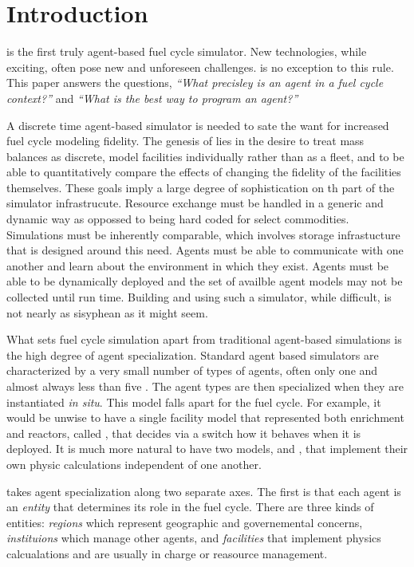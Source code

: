 \section{Introduction}

\Cyclus \citeme is the first truly agent-based \citeme fuel cycle simulator. 
New technologies, while exciting, often pose new and unforeseen challenges.
\Cyclus is no exception to this rule.  This paper answers the questions,
\emph{``What precisley is an agent in a fuel cycle context?''} and 
\emph{``What is the best way to program an agent?''}

A discrete time agent-based simulator is needed to sate the want for increased 
fuel cycle modeling fidelity. The genesis of \cyclus lies in the desire to 
treat mass balances as discrete, model facilities individually rather than as 
a fleet, and to be able to quantitatively compare the effects of changing the 
fidelity of the facilities themselves. These goals imply a large degree of 
sophistication on th part of the simulator infrastrucute.  Resource exchange
must be handled in a generic and dynamic way as oppossed to being hard coded 
for select commodities. Simulations must be inherently comparable, which involves 
storage infrastucture that is designed around this need. Agents must be able 
to communicate with one another and learn about the environment in which they 
exist. Agents must be able to be dynamically deployed and the set of 
availble agent models may not be collected until run time. Building and using such a
simulator, while difficult, is not nearly as sisyphean as it might seem. 

What sets fuel cycle simulation apart from traditional agent-based simulations 
is the high degree of agent specialization. Standard agent based simulators
are characterized by a very small number of types of agents, often only one and 
almost always less than five \citeme. The agent types are then specialized 
when they are instantiated \emph{in situ}. This model falls apart for the 
fuel cycle.  For example, it would be unwise to have a single facility model 
that represented both enrichment and reactors, called ,
that decides via a switch how it behaves when it is deployed. It is much 
more natural to have two models,  and , 
that implement their own physic calculations independent of one another.

\Cyclus takes agent specialization along two separate axes. The first is 
that each agent is an \emph{entity} that determines its role in the 
fuel cycle. There are three kinds of entities: \emph{regions} which 
represent geographic and governemental concerns, \emph{instituions} 
which manage other agents, and \emph{facilities} that implement 
physics calcualations and are usually in charge or reasource management.


